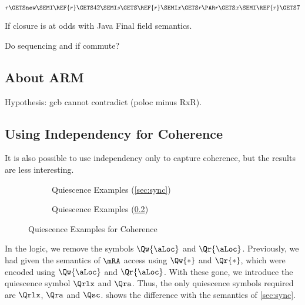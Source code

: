 \begin{displaymath}
  r \GETS \mathtt{new}\SEMI
  \REF{r} \GETS 42\SEMI
  s \GETS \REF{r}\SEMI
  x \GETS r
  \PAR
  r \GETS x\SEMI
  \REF{r} \GETS 7
\end{displaymath}

If closure is at odds with Java Final field semantics.

Do sequencing and if commute?

\subsection{About ARM}
Hypothesis: gcb cannot contradict (poloc minus RxR).


\subsection{Using Independency for Coherence}
\label{sec:independency-co}

It is also possible to use independency only to capture coherence, but the
results are less interesting.

\begin{figure*}[t]
  \begin{subfigure}{.5\textwidth}
    \centering
    
    \caption{Quiescence Examples (\textsection\ref{sec:sync})}
    \label{fig:q1}
  \end{subfigure}  
  \begin{subfigure}{.5\textwidth}
    \centering
    
    \caption{Quiescence Examples (\textsection\ref{sec:independency-co})}
    \label{fig:q2}
  \end{subfigure}
  \caption{Quiescence Examples for Coherence}
  \label{fig:q-co}
\end{figure*}
%   
%   

In the logic, we remove the symbols $\Qw{\aLoc}$ and $\Qr{\aLoc}$.
Previously, we had given the semantics of $\mRA$ access using $\Qw{*}$ and
$\Qr{*}$, which were encoded using $\Qw{\aLoc}$ and $\Qr{\aLoc}$.  With these
gone, we introduce the quiescence symbol $\Qrlx$ and $\Qra$.  Thus, the only
quiescence symbols required are $\Qrlx$, $\Qra$ and $\Qsc$.
 shows the difference with the semantics of \textsection\ref{sec:sync}.

